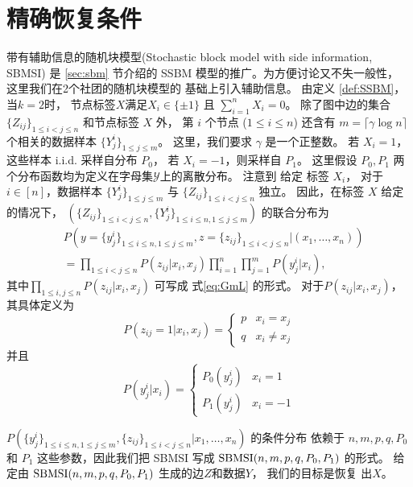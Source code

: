 \section{精确恢复条件}\label{sec:sbmsi_exact_recovery_condition}
带有辅助信息的随机块模型(Stochastic block model with side information, SBMSI)
是 \ref{sec:sbm} 节介绍的
SSBM 模型的推广。为方便讨论又不失一般性，
这里我们在2个社团的随机块模型的
基础上引入辅助信息。
由定义 \ref{def:SSBM}，当$k=2$时，
节点标签$X$满足$X_i \in \{\pm 1\}$
且 $\sum_{i=1}^n X_i = 0$。
除了图中边的集合
$\{Z_{ij}\}_{1\le i<j\le n}$
和节点标签 $X$ 外，
第 $i$  个节点 ($1\leq i \leq n$) 
还含有 $m=\lceil \gamma \log n \rceil $ 个相关的数据样本 
$\{Y^{i}_j\}_{1\leq j \leq m}$。
这里，我们要求 $\gamma$ 是一个正整数。
若 $X_i=1$，
这些样本 i.i.d. 采样自分布 $P_0$，
若 $X_i=-1$，则采样自 $P_1$。
这里假设 $P_0, P_1$ 两个分布函数均为定义在字母集$\mathcal{Y}$上的离散分布。
注意到 给定 标签 $X_i$，
对于 $i\in [n]$，数据样本 $\{Y^{i}_j\}_{1\leq j \leq m}$ 与 $\{Z_{ij}\}_{1\le i<j\le n}$ 独立。
因此，在标签 $X$ 给定的情况下，
  $(\{Z_{ij}\}_{1\le i<j\le n},\{Y^i_{j}\}_{1\le i\le n,1\le j\le m})$ 的联合分布为  
\begin{align}\label{eq:lh}
    &P\left(y=\{y^i_{j}\}_{1\le i\le n,1\le j\le m},z=\{z_{ij}\}_{1\le i<j\le n}| (x_1,\ldots,x_n) \right) \nonumber\\
    &= \prod_{1\le i < j\le n}P(z_{ij}|x_i,x_j)\prod_{i=1}^n \prod_{j=1}^m P(y^i_j|x_i), 
\end{align}
其中$\prod_{1\le i,j\le n}P(z_{ij}|x_i,x_j)$ 可写成
式\eqref{eq:GmL} 的形式。
对于$P(z_{ij}|x_i,x_j)$，其具体定义为
\begin{equation*}
    P  (z_{ij}=1|x_i,x_j) = \begin{cases}
        p &   x_i = x_j \\
        q &   x_i\ne x_j
    \end{cases}
\end{equation*}
并且
\begin{equation*}
    P(y^i_j|x_i) = \begin{cases}
        P_0(y^i_j) & x_i = 1 \\
        P_1(y^i_j) & x_i = -1
    \end{cases}
\end{equation*}

 $P(\{y^i_{j}\}_{1\le i\le n,1\le j\le m},\{z_{ij}\}_{1\le i<j\le n}| x_1,\ldots,x_n)$ 
 的条件分布 依赖于
 $n,m,p, q, P_0$ 和 $P_1$ 这些参数，因此我们把 SBMSI 写成 $\operatorname{SBMSI}(n,m,p,q,P_0,P_1)$ 的形式。
 给定由 $\operatorname{SBMSI}(n,m,p,q,P_0,P_1)$ 生成的边$Z$和数据$Y$， 我们的目标是恢复 出$X$。
 
